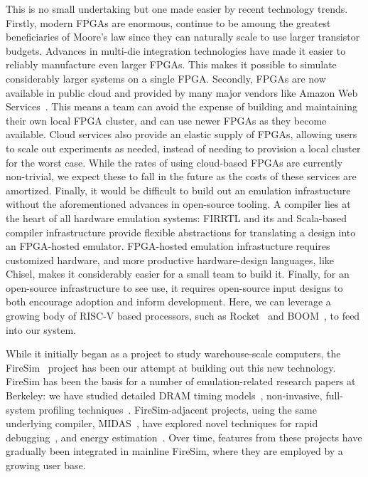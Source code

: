 This is no small undertaking but one made easier by recent technology trends.
Firstly, modern FPGAs are enormous, continue to be amoung the greatest
beneficiaries of Moore's law since they can naturally scale to use larger
transistor budgets. Advances in multi-die integration technologies have made
it easier to reliably manufacture even larger FPGAs. This makes it possible to
simulate considerably larger systems on a single FPGA.  Secondly, FPGAs are now available
in public cloud and provided by many major vendors like Amazon Web Services~\cite{amazonf1}.
This means a team can avoid the expense of building and
maintaining their own local FPGA cluster, and can use newer FPGAs as they
become available. Cloud services also provide an elastic supply of FPGAs,
allowing users to scale out experiments as needed, instead of needing to
provision a local cluster for the worst case. While the rates of using
cloud-based FPGAs are currently non-trivial, we expect these to fall in the
future as the costs of these services are amortized. Finally, it would be
difficult to build out an emulation infrastucture without the aforementioned advances in
open-source tooling. A compiler lies at the heart of all hardware emulation systems:
FIRRTL and its and Scala-based compiler infrastructure provide flexible
abstractions for translating a design into an FPGA-hosted emulator. FPGA-hosted emulation
infrastucture requires customized hardware, and more productive hardware-design
languages, like Chisel, makes it considerably easier for a small team to build
it. Finally, for an open-source infrastructure to see use, it
requires open-source input designs to both encourage adoption and inform
development. Here, we can leverage a growing body of RISC-V based processors,
such as Rocket~\cite{RocketChip} and BOOM~\cite{BOOM}, to feed into our system.

While it initially began as a project to study warehouse-scale computers, the
FireSim~\cite{FireSim} project has been our attempt at building out this
new technology. FireSim has been the basis for a
number of emulation-related research papers at Berkeley: we have studied
detailed DRAM timing models~\cite{FASED}, non-invasive, full-system profiling
techniques~\cite{FirePerf}.  FireSim-adjacent projects, using the same
underlying compiler, MIDAS~\cite{MIDAS}, have explored novel techniques for rapid
debugging~\cite{DESSERT}, and energy estimation~\cite{Simmani, Strober}. Over
time, features from these projects have gradually been integrated in mainline
FireSim, where they are employed by a growing user base.

